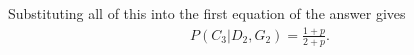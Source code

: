 \begin{exercise}[BH.2.41]
\begin{solution}
\begin{enumerate}
		Substituting all of this into the first equation of the answer gives
		\begin{align*}
			P(C_{3}|D_2,G_2) = \frac{1+p}{2+p}.
		\end{align*}
	\end{enumerate}
\end{solution}
\end{exercise}

